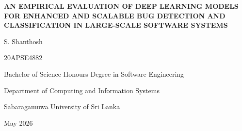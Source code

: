 \documentclass[12pt,a4paper,oneside]{report}
\begin{document}
\begin{titlepage}
\thispagestyle{empty}
\centering
\setlength{\parskip}{0pt}

{\fontsize{16}{28.8}\selectfont\bfseries
AN EMPIRICAL EVALUATION OF DEEP LEARNING MODELS FOR ENHANCED AND SCALABLE BUG DETECTION AND CLASSIFICATION IN LARGE-SCALE SOFTWARE SYSTEMS\par}

\vspace{40mm}

{\fontsize{14}{25.2}\selectfont S. Shanthosh\par}

\vspace{10mm}

{\fontsize{14}{25.2}\selectfont 20APSE4882\par}

\vspace{22mm}

{\fontsize{14}{25.2}\selectfont Bachelor of Science Honours Degree in Software Engineering\par}

\vspace{22mm}

{\fontsize{14}{25.2}\selectfont Department of Computing and Information Systems\par}

\vspace{10mm}

{\fontsize{14}{25.2}\selectfont Sabaragamuwa University of Sri Lanka\par}

\vspace{16mm}

{\fontsize{14}{25.2}\selectfont May 2026\par}

\end{titlepage}
\end{document}
